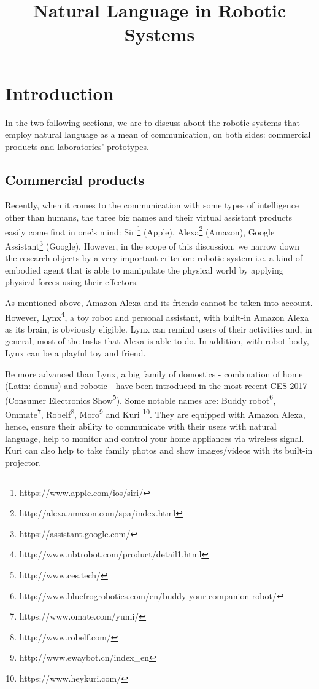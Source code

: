 \documentclass[10pt, a4paper]{article}
\title{Natural Language in Robotic Systems}
\begin{document}
\maketitleabstract

\section{Introduction}
In the two following sections, we are to discuss about the robotic systems that employ natural language as a mean of communication, on both sides: commercial products and laboratories' prototypes.

\subsection{Commercial products}
Recently, when it comes to the communication with some types of intelligence other than humans, the three big names and their virtual assistant products easily come first in one's mind: Siri\footnote{https://www.apple.com/ios/siri/} (Apple), Alexa\footnote{http://alexa.amazon.com/spa/index.html} (Amazon), Google Assistant\footnote{https://assistant.google.com/} (Google). However, in the scope of this discussion, we narrow down the research objects by a very important criterion: robotic system i.e. a kind of embodied agent that is able to manipulate the physical world by applying physical forces using their effectors.

As mentioned above, Amazon Alexa and its friends cannot be taken into account. However, Lynx\footnote{http://www.ubtrobot.com/product/detail1.html}, a toy robot and personal assistant, with built-in Amazon Alexa as its brain, is obviously eligible. Lynx can remind users of their activities and, in general, most of the tasks that Alexa is able to do. In addition, with robot body, Lynx can be a playful toy and friend.

Be more advanced than Lynx, a big family of domostics - combination of home (Latin: domus) and robotic - have been introduced in the most recent CES 2017 (Consumer Electronics Show\footnote{http://www.ces.tech/}). Some notable names are: Buddy robot\footnote{http://www.bluefrogrobotics.com/en/buddy-your-companion-robot/}, Ommate\footnote{https://www.omate.com/yumi/}, Robelf\footnote{http://www.robelf.com/}, Moro\footnote{http://www.ewaybot.cn/index\_en} and Kuri \footnote{https://www.heykuri.com/}. They are equipped with Amazon Alexa, hence, ensure their ability to communicate with their users with natural language, help to monitor and control your home appliances via wireless signal. Kuri can also help to take family photos and show images/videos with its built-in projector.
\end{document}
